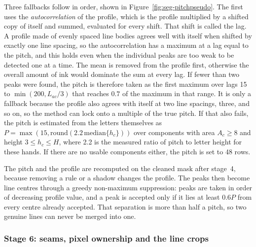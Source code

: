 Three fallbacks follow in order, shown in Figure~\ref{fig:seg-pitchpseudo}. The first uses the \emph{autocorrelation} of the profile, which is the profile multiplied by a shifted copy of itself and summed, evaluated for every shift. That shift is called the lag. A profile made of evenly spaced line bodies agrees well with itself when shifted by exactly one line spacing, so the autocorrelation has a maximum at a lag equal to the pitch, and this holds even when the individual peaks are too weak to be detected one at a time. The mean is removed from the profile first, otherwise the overall amount of ink would dominate the sum at every lag. If fewer than two peaks were found, the pitch is therefore taken as the first maximum over lags 15 to $\min(200,L_{ac}/3)$ that reaches $0.7$ of the maximum in that range. It is only a fallback because the profile also agrees with itself at two line spacings, three, and so on, so the method can lock onto a multiple of the true pitch. If that also fails, the pitch is estimated from the letters themselves as $P=\max(15,\mathrm{round}(2.2\,\mathrm{median}\{h_c\}))$ over components with area $A_c\ge8$ and height $3\le h_c\le H$, where 2.2 is the measured ratio of pitch to letter height for these hands. If there are no usable components either, the pitch is set to 48 rows.

The pitch and the profile are recomputed on the cleaned mask after stage~4, because removing a rule or a shadow changes the profile. The peaks then become line centres through a greedy non-maximum suppression: peaks are taken in order of decreasing profile value, and a peak is accepted only if it lies at least $0.6P$ from every centre already accepted. That separation is more than half a pitch, so two genuine lines can never be merged into one.

\subsubsection{Stage 6: seams, pixel ownership and the line crops}

